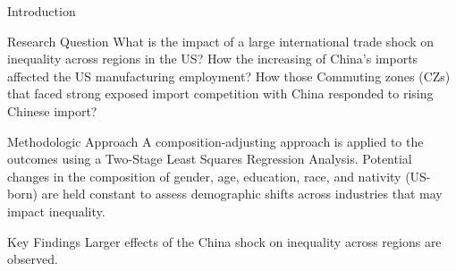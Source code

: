 \begin{frame}{Introduction}

    \begin{block}{Research Question}
        What is the impact of a large international trade shock on inequality across regions in the US?
        How the increasing of China’s imports affected the US manufacturing employment?
        How those Commuting zones (CZs) that faced strong exposed import competition with China responded to rising Chinese import?
    \end{block}

    \begin{block}{Methodologic Approach}
        A composition-adjusting approach is applied to the outcomes using a Two-Stage Least Squares Regression Analysis. Potential changes in the composition of gender, age, education, race, and nativity (US-born) are held constant to assess demographic shifts across industries that may impact inequality.
    \end{block}

    \begin{block}{Key Findings}
        Larger effects of the China shock on inequality across regions are observed.
    \end{block}
\end{frame}